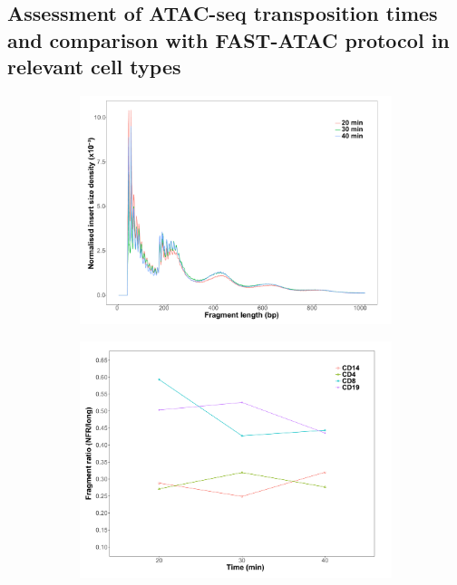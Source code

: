 \subsection{Assessment of ATAC-seq transposition times and comparison with FAST-ATAC protocol in relevant cell types}


\begin{figure}[htbp]
\centering
\begin{subfigure}{0.5\textwidth}
\centering
\includegraphics[width=\textwidth]{./Results1/pdfs/ATAC_CD8_fragment_size_distribution_20_30_40min}
\caption{\textbf{}}
\end{subfigure}
\begin{subfigure}{0.5\textwidth}
\centering
\includegraphics[width=\textwidth]{./Results1/pdfs/ATAC_ratio_short_long_fragments_20_30_40_min}

\end{subfigure}
\end{figure}
